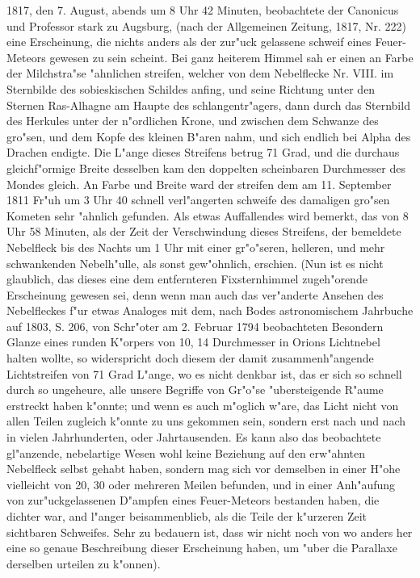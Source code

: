 \documentclass[a4paper, 11pt, oneside, polutonikogreek, german]{article}
\begin{document}
1817, den 7. August, abends um 8 Uhr 42 Minuten, beobachtete der Canonicus und Professor stark zu Augsburg, (nach der Allgemeinen Zeitung, 1817, Nr. 222) eine Erscheinung, die nichts anders als der zur"uck gelassene schweif eines Feuer-Meteors gewesen zu sein scheint. Bei ganz heiterem Himmel sah er einen an Farbe der Milchstra"se "ahnlichen streifen, welcher von dem Nebelflecke Nr. VIII. im Sternbilde des sobieskischen Schildes anfing, und seine Richtung unter den Sternen Ras-Alhagne am Haupte des schlangentr"agers, dann durch das Sternbild des Herkules unter der n"ordlichen Krone, und zwischen dem Schwanze des gro"sen, und dem Kopfe des kleinen B"aren nahm, und sich endlich bei Alpha des Drachen endigte. Die L"ange dieses Streifens betrug 71 Grad, und die durchaus gleichf"ormige Breite desselben kam den doppelten scheinbaren Durchmesser des Mondes gleich. An Farbe und Breite ward der streifen dem am 11. September 1811 Fr"uh um 3 Uhr 40 schnell verl"angerten schweife des damaligen gro"sen Kometen sehr "ahnlich gefunden. Als etwas Auffallendes wird bemerkt, das von 8 Uhr 58 Minuten, als der Zeit der Verschwindung dieses Streifens, der bemeldete Nebelfleck bis des Nachts um 1 Uhr mit einer gr"o"seren, helleren, und mehr schwankenden Nebelh"ulle, als sonst gew"ohnlich, erschien. (Nun ist es nicht glaublich, das dieses eine dem entfernteren Fixsternhimmel zugeh"orende Erscheinung gewesen sei, denn wenn man auch das ver"anderte Ansehen des Nebelfleckes f"ur etwas Analoges mit dem, nach Bodes astronomischem Jahrbuche auf 1803, S. 206, von Schr"oter am 2. Februar 1794 beobachteten Besondern Glanze eines runden K"orpers von 10, 14 Durchmesser in Orions Lichtnebel halten wollte, so widerspricht doch diesem der damit zusammenh"angende Lichtstreifen von 71 Grad L"ange, wo es nicht denkbar ist, das er sich so schnell durch so ungeheure, alle unsere Begriffe von Gr"o"se "ubersteigende R"aume erstreckt haben k"onnte; und wenn es auch m"oglich w"are, das Licht nicht von allen Teilen zugleich k"onnte zu uns gekommen sein, sondern erst nach und nach in vielen Jahrhunderten, oder Jahrtausenden. Es kann also das beobachtete gl"anzende, nebelartige Wesen wohl keine Beziehung auf den erw"ahnten Nebelfleck selbst gehabt haben, sondern mag sich vor demselben in einer H"ohe vielleicht von 20, 30 oder mehreren Meilen befunden, und in einer Anh"aufung von zur"uckgelassenen D"ampfen eines Feuer-Meteors bestanden haben, die dichter war, and l"anger beisammenblieb, als die Teile der k"urzeren Zeit sichtbaren Schweifes. Sehr zu bedauern ist, dass wir nicht noch von wo anders her eine so genaue Beschreibung dieser Erscheinung haben, um "uber die Parallaxe derselben urteilen zu k"onnen).
\end{document}
